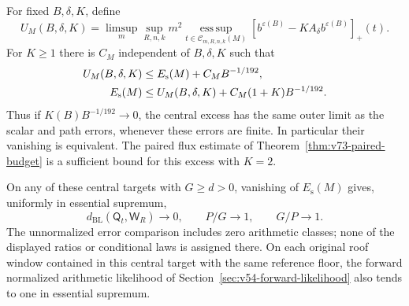 \begin{corollary}
\label{cor:v73-central-excess}
For fixed $B,\delta,K$, define
\[
 U_M(B,\delta,K)=\limsup_m\sup_{R,n,k}m^2
  \operatorname*{ess\,sup}_{t\in\mathcal C_{m,R,n,k}(M)}
             [b^{\varepsilon(B)}-KA_\delta b^{\varepsilon(B)}]_+(t).
\]
For $K\ge1$ there is $C_M$ independent of $B,\delta,K$ such that
\begin{align}
 U_M(B,\delta,K)&\le E_{\mathrm s}(M)+C_MB^{-1/192},\notag\\
 E_{\mathrm s}(M)&\le U_M(B,\delta,K)
                         +C_M(1+K)B^{-1/192}.\label{eq:v73-central-sandwich}
\end{align}
Thus if $K(B)B^{-1/192}\to0$, the central excess has the same
outer limit as the scalar and path errors, whenever these errors
are finite. In particular their vanishing is equivalent. The paired
flux estimate of Theorem~\ref{thm:v73-paired-budget} is a sufficient
bound for this excess with $K=2$.

On any of these central targets with $G\ge d>0$, vanishing of
$E_{\mathrm s}(M)$ gives, uniformly in essential supremum,
\[
 d_{\mathrm{BL}}(\mathsf Q_t,\mathsf W_R)\longrightarrow0,
 \qquad P/G\longrightarrow1,\qquad G/P\longrightarrow1.
\]
The unnormalized error comparison includes zero arithmetic classes;
none of the displayed ratios or conditional laws is assigned there.
On each original roof window contained in this central target with
the same reference floor, the forward normalized arithmetic likelihood
of Section~\ref{sec:v54-forward-likelihood} also tends to one in
essential supremum.
\end{corollary}
